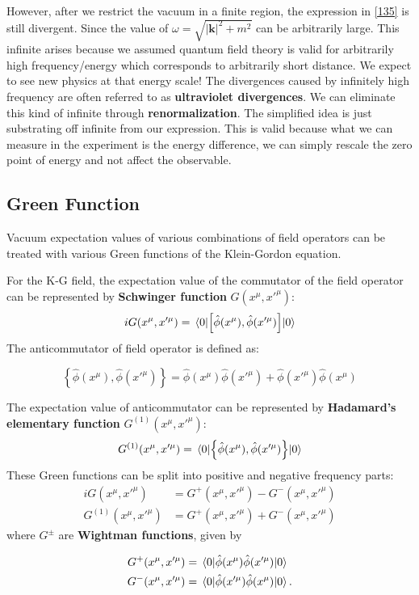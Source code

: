 \documentclass[12pt]{article}
\numberwithin{equation}{subsection}
\theoremstyle{mystyle}{\newtheorem{definition}{Definition}[subsection]}
\theoremstyle{mystyle}{\newtheorem{theorem}[definition]{Theorem}}
\theoremstyle{mystyle}{\newtheorem*{remark}{Remark}}
\theoremstyle{mystyle}{\newtheorem{example}{Example}[subsection]}
\theoremstyle{mystyle}{\newtheorem{examples}{Examples}[subsection]}
\theoremstyle{mystyle}{\newtheorem{cthm}{}[subsection]}
\newcommand{\tbf}[1]{\textbf{#1}}
\begin{document}
However, after we restrict the vacuum in a finite region, the expression in \ref{135} is still divergent.
Since the value of \(\omega=\sqrt{|\mathbf{k}|^2+m^2}\) can be arbitrarily large.
This infinite arises because we assumed quantum field theory is valid for arbitrarily high frequency/energy
which corresponds to arbitrarily short distance. We expect to see new physics at that energy scale!
The divergences caused by infinitely high frequency are often referred to as \tbf{ultraviolet divergences}.
We can eliminate this kind of infinite through \tbf{renormalization}.
The simplified idea is just substrating off infinite from our expression.
This is valid because what we can measure in the experiment is the energy difference,
we can simply rescale the zero point of energy and not affect the observable.




\subsection{Green Function}
Vacuum expectation values of various combinations of field operators can be treated with various Green functions of the Klein-Gordon equation.

For the K-G field, the expectation value of the commutator of the field operator can be represented by \tbf{Schwinger function} \(G(x^{\mu},x'^{\mu})\):
\begin{equation}
  iG(x^{\mu},x'^{\mu})=\expval{\left[\hat{\phi}(x^{\mu}),\hat{\phi}(x'^{\mu})\right]}{0}
\end{equation}
The anticommutator of field operator is defined as:
\begin{definition}[Anticommutator]
  \[\left\{\hat{\phi}(x^{\mu}),\hat{\phi}(x'^{\mu})\right\}=\hat{\phi}(x^{\mu})\hat{\phi}(x'^{\mu})+\hat{\phi}(x'^{\mu})\hat{\phi}(x^{\mu})\]
\end{definition}
The expectation value of anticommutator can be represented by \tbf{Hadamard's elementary function} \(G^{(1)}(x^{\mu},x'^{\mu})\):
\begin{equation}
  G^{(1)}(x^{\mu},x'^{\mu})=\expval{\left\{\hat{\phi}(x^{\mu}),\hat{\phi}(x'^{\mu})\right\}}{0}
\end{equation}
These Green functions can be split into positive and negative frequency parts:
\begin{align}
  iG(x^{\mu},x'^{\mu})      & = G^+(x^{\mu},x'^{\mu})-G^-(x^{\mu},x'^{\mu}) \\
  G^{(1)}(x^{\mu},x'^{\mu}) & =G^+(x^{\mu},x'^{\mu})+G^-(x^{\mu},x'^{\mu})
\end{align}
where \(G^{\pm}\) are \tbf{Wightman functions}, given by
\begin{cthm}
  \begin{align*}
    G^+(x^{\mu},x'^{\mu}) & =\expval{\hat{\phi}(x^{\mu})\hat{\phi}(x'^{\mu})}{0}  \\
    G^-(x^{\mu},x'^{\mu}) & =\expval{\hat{\phi}(x'^{\mu})\hat{\phi}(x^{\mu})}{0}.
  \end{align*}
\end{cthm}
\end{document}
